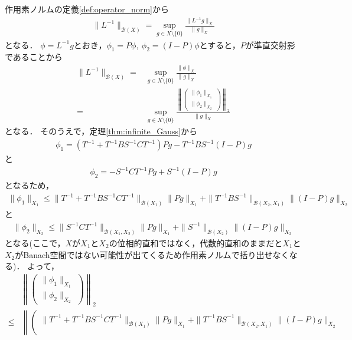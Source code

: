 \begin{Proof}
作用素ノルムの定義\eqref{def:operator_norm}から
	\begin{align*}
		\| L^{-1} \|_{{\mathcal B}(X)} = \sup_{ g \in X \setminus \{ 0 \} } \frac{ \| L^{-1} g \|_{X} }{ \| g \|_{X} }
	\end{align*}
となる．
$\phi = L^{-1}g$とおき，$\phi_1 = P \phi, ~ \phi_2 = (I - P) \phi$とすると，$P$が準直交射影であることから
	\begin{align*}
		\| L^{-1} \|_{{\mathcal B}(X)} =& \sup_{ g \in X \setminus \{ 0 \} } \frac{ \| \phi \|_{X} }{ \| g \|_{X} } \\
		=& \sup_{ g \in X \setminus \{ 0 \} } \frac{\left\| \left( \begin{array}{c}
		 \| \phi_1 \|_{X_1} \\
		 \| \phi_2 \|_{X_2}
		 \end{array} \right) \right\|_2 }{ \| g \|_{X} }
	\end{align*}
となる．
そのうえで，定理\ref{thm:infinite_Gauss}から
	\begin{align*}
		\phi_1 = ( T^{-1}  + T^{-1} B S^{-1} C T^{-1}) Pg - T^{-1} B S^{-1} (I-P)g
	\end{align*}
と
	\begin{align*}
		\phi_2 = -S^{-1} C T^{-1} Pg + S^{-1} (I-P)g
	\end{align*}
となるため，
	\begin{align*}
		\| \phi_1 \|_{X_1} \le \|  T^{-1}  + T^{-1} B S^{-1} C T^{-1} \|_{{\mathcal B}(X_1)} \| Pg \|_{X_1} + \| T^{-1} B S^{-1} \|_{{\mathcal B}(X_2, X_1)} \| (I-P)g \|_{X_2}
	\end{align*}
と
	\begin{align*}
		\| \phi_2 \|_{X_2} \le \| S^{-1} C T^{-1} \|_{{\mathcal B}(X_1, X_2)} \| Pg \|_{X_1} + \| S^{-1} \|_{{\mathcal B}(X_2)} \| (I-P)g \|_{X_2}
	\end{align*}
となる(ここで，$X$が$X_1$と$X_2$の位相的直和ではなく，代数的直和のままだと$X_1$と$X_2$がBanach空間ではない可能性が出てくるため作用素ノルムで括り出せなくなる)．
よって，
	\begin{align*}
		& \left\| \left( \begin{array}{c}
		 \| \phi_1 \|_{X_1} \\
		 \| \phi_2 \|_{X_2}
		 \end{array} \right) \right\|_2  \\
		\le& \left\| \left( \begin{array}{c}
		 \|  T^{-1}  + T^{-1} B S^{-1} C T^{-1} \|_{{\mathcal B}(X_1)} \| Pg \|_{X_1} + \| T^{-1} B S^{-1} \|_{{\mathcal B}(X_2, X_1)} \| (I-P)g \|_{X_2} \\

\end{array}
\end{align*}
\end{Proof}
